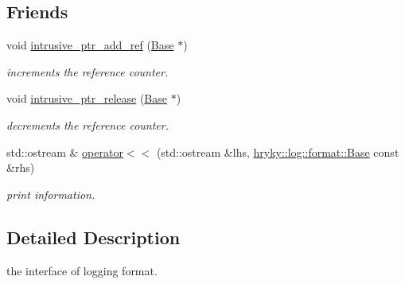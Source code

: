 \subsection*{Friends}
\begin{DoxyCompactItemize}
\item 
\hypertarget{classhryky_1_1log_1_1format_1_1_base_abf514baa69ca1c3228441e8614f59a34}{void \hyperlink{classhryky_1_1log_1_1format_1_1_base_abf514baa69ca1c3228441e8614f59a34}{intrusive\-\_\-ptr\-\_\-add\-\_\-ref} (\hyperlink{classhryky_1_1log_1_1format_1_1_base}{Base} $\ast$)}\label{classhryky_1_1log_1_1format_1_1_base_abf514baa69ca1c3228441e8614f59a34}

\begin{DoxyCompactList}\small\item\em increments the reference counter. \end{DoxyCompactList}\item 
\hypertarget{classhryky_1_1log_1_1format_1_1_base_a5687cea108416379e4c11f156f2e6c95}{void \hyperlink{classhryky_1_1log_1_1format_1_1_base_a5687cea108416379e4c11f156f2e6c95}{intrusive\-\_\-ptr\-\_\-release} (\hyperlink{classhryky_1_1log_1_1format_1_1_base}{Base} $\ast$)}\label{classhryky_1_1log_1_1format_1_1_base_a5687cea108416379e4c11f156f2e6c95}

\begin{DoxyCompactList}\small\item\em decrements the reference counter. \end{DoxyCompactList}\item 
\hypertarget{classhryky_1_1log_1_1format_1_1_base_aa738ea49e07d128ff8dce7c20cb9285d}{std\-::ostream \& \hyperlink{classhryky_1_1log_1_1format_1_1_base_aa738ea49e07d128ff8dce7c20cb9285d}{operator$<$$<$} (std\-::ostream \&lhs, \hyperlink{classhryky_1_1log_1_1format_1_1_base}{hryky\-::log\-::format\-::\-Base} const \&rhs)}\label{classhryky_1_1log_1_1format_1_1_base_aa738ea49e07d128ff8dce7c20cb9285d}

\begin{DoxyCompactList}\small\item\em print information. \end{DoxyCompactList}\end{DoxyCompactItemize}


\subsection{Detailed Description}
the interface of logging format. 

